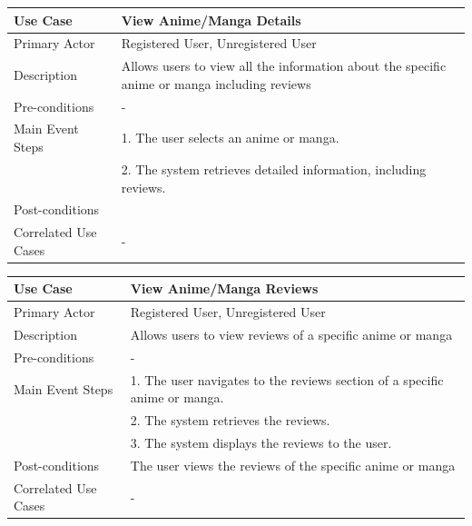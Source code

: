 \begin{longtable}{|p{}|p{}|}
    \hline
    \rowcolor{lightblue}
    \textbf{Use Case} & \textbf{View Anime/Manga Details} \\
    \hline
    Primary Actor & Registered User, Unregistered User\\
    \hline
    Description & Allows users to view all the information about the specific anime or manga including reviews\\
    \hline
    Pre-conditions & -\\
    \hline
    Main Event Steps & 1. The user selects an anime or manga. \\
    & 2. The system retrieves detailed information, including reviews. \\
    \hline
    Post-conditions & \\
    \hline
    Correlated Use Cases & -\\
    \hline
\end{longtable}


\begin{longtable}{|p{}|p{}|}
    \hline
    \rowcolor{lightblue}
    \textbf{Use Case} & \textbf{View Anime/Manga Reviews} \\
    \hline
    Primary Actor & Registered User, Unregistered User\\
    \hline
    Description &Allows users to view reviews of a specific anime or manga\\
    \hline
    Pre-conditions & - \\
    \hline
    Main Event Steps & 1. The user navigates to the reviews section of a specific anime or manga.\\
    & 2. The system retrieves the reviews. \\
    & 3. The system displays the reviews to the user. \\
    \hline
    Post-conditions & The user views the reviews of the specific anime or manga\\
    \hline
    Correlated Use Cases & - \\
    \hline
\end{longtable}


